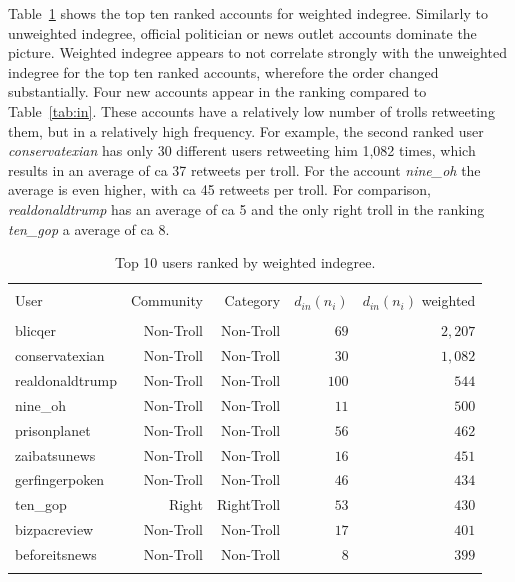 \documentclass[12pt, titlepage=true, toc=bib]{scrartcl}
\begin{document}
Table~\ref{tab:win} shows the top ten ranked accounts for weighted indegree. Similarly to unweighted indegree, official politician or news outlet accounts dominate the picture. Weighted indegree appears to not correlate strongly with the unweighted indegree for the top ten ranked accounts, wherefore the order changed substantially. Four new accounts appear in the ranking compared to Table~\ref{tab:in}. These accounts have a relatively low number of trolls retweeting them, but in a relatively high frequency. For example, the second ranked user \textit{conservatexian} has only 30 different users retweeting him 1,082 times, which results in an average of ca 37 retweets per troll. For the account \textit{nine\_oh} the average is even higher, with ca 45 retweets per troll. For comparison, \textit{realdonaldtrump} has an average of ca 5 and the only right troll in the ranking \textit{ten\_gop} a average of ca 8.

\begin{table}[!ht] \centering 
  \begin{tabular*}{.95\linewidth}{@{\extracolsep{\fill}} lrrrr} 
\\[-1.8ex]\hline 
\hline \\[-1.8ex] 
User & Community & Category & \( d_{in}(n_{i}) \) & \( d_{in}(n_{i}) \) weighted \\ 
\hline \\[-1.8ex] 
blicqer & Non-Troll & Non-Troll & $69$ & $2,207$ \\ 
conservatexian & Non-Troll & Non-Troll & $30$ & $1,082$ \\ 
realdonaldtrump & Non-Troll & Non-Troll & $100$ & $544$ \\ 
nine\_oh & Non-Troll & Non-Troll & $11$ & $500$ \\ 
prisonplanet & Non-Troll & Non-Troll & $56$ & $462$ \\ 
zaibatsunews & Non-Troll & Non-Troll & $16$ & $451$ \\ 
gerfingerpoken & Non-Troll & Non-Troll & $46$ & $434$ \\ 
ten\_gop & Right & RightTroll & $53$ & $430$ \\ 
bizpacreview & Non-Troll & Non-Troll & $17$ & $401$ \\ 
beforeitsnews & Non-Troll & Non-Troll & $8$ & $399$ \\ 
\hline \\[-1.8ex] 
\end{tabular*} 
\caption[Indegree weighted]{Top 10 users ranked by weighted indegree.} 
  \label{tab:win} 
\end{table}
\end{document}
